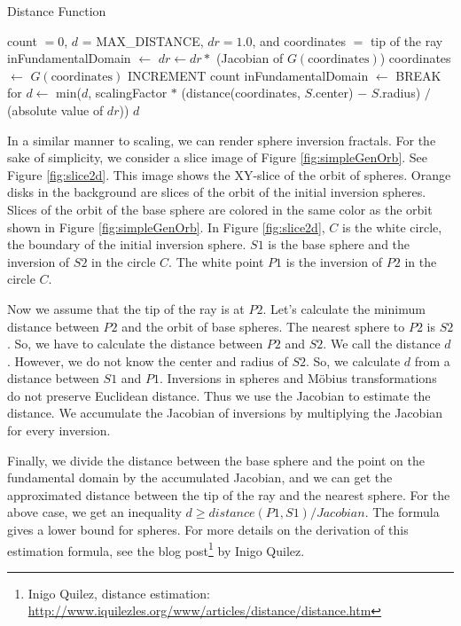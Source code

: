 \begin{algorithm}
 \caption{Distance Function}
 \label{iis3d}
 \begin{algorithmic}
  \REQUIRE count $= 0$, $d$ = MAX\_DISTANCE, $dr = 1.0$, and coordinates
  $=$ tip of the ray
  \STATE inFundamentalDomain $\leftarrow$ \TRUE
  \STATE $dr \leftarrow dr * $ (Jacobian of $G(\text{coordinates})$)
  \STATE coordinates $\leftarrow$ $G(\text{coordinates})$
  \STATE INCREMENT count
  \STATE inFundamentalDomain $\leftarrow$ \FALSE
  \ENDIF
  \ENDFOR
  \STATE BREAK for
  \ENDIF
  \ENDFOR
  \STATE $d \leftarrow$ min($d$, scalingFactor $*$ (distance(coordinates, $S$.center) $-$
  $S$.radius) $/$ (absolute value of $dr$))
  \ENDFOR
  \RETURN $d$
 \end{algorithmic}
\end{algorithm}

In a similar manner to scaling, we can render sphere inversion
fractals.
For the sake of simplicity, we consider a slice image of Figure
\ref{fig:simpleGenOrb}.
See Figure \ref{fig:slice2d}. This image shows the XY-slice of the orbit
of spheres.
Orange disks in the background are slices of the orbit of the initial inversion spheres.
Slices of the orbit of the base sphere are colored in
the same color as the orbit shown in Figure \ref{fig:simpleGenOrb}.
In Figure \ref{fig:slice2d},
$C$ is the white circle, the boundary of the initial inversion sphere.
$S1$ is the base sphere and the inversion of $S2$ in the circle $C$. 
The white point $P1$ is the inversion of $P2$ in the circle $C$.

Now we assume that the tip of the ray is at $P2$.
Let's calculate the minimum distance between
$P2$ and the orbit of base spheres.
The nearest sphere to $P2$ is $S2$.
So, we have to calculate the distance between $P2$ and $S2$.
We call the distance $d$.
However, we do not know the center and radius of $S2$.
So, we calculate $d$ from a distance between $S1$ and $P1$.
Inversions in spheres and M\"obius transformations do not preserve
Euclidean distance.
Thus we use the Jacobian to estimate the distance.
We accumulate the Jacobian of inversions by multiplying the Jacobian for
every inversion.

Finally, we divide the distance between the base sphere and the point on
the fundamental domain by the accumulated Jacobian, and we can get the
approximated distance between the tip of the ray and the nearest sphere.
For the above case, we get an inequality $d \geq distance(P1, S1)/Jacobian$.
The formula gives a lower bound for spheres.
For more details on the derivation of this estimation formula, see the
blog post\footnote{Inigo Quilez, distance estimation:
\url{http://www.iquilezles.org/www/articles/distance/distance.htm}}
by Inigo Quilez.

